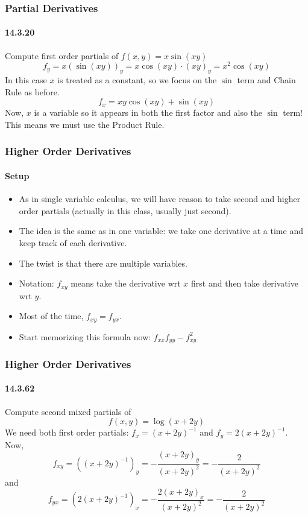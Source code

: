 \documentclass[xcolor=svgnames]{beamer}
\begin{document}
\begin{frame}
\frametitle{Partial Derivatives}
\framesubtitle{14.3.20}
Compute first order partials of $f(x,y) = x \sin (xy)$
\[
f_y = x (\sin (xy))_y = x \cos (xy) \cdot (xy)_y = x^2 \cos (xy) 
\]
In this case $x$ is treated as a constant, so we focus on the $\sin$ term and Chain Rule as before. 
\[
f_x = xy \cos (xy) + \sin (xy)
\]
Now, $x$ is a variable so it appears in both the first factor and also the $\sin$ term! This means we must use the Product Rule. 
\end{frame}
\begin{frame}
\frametitle{Higher Order Derivatives}
\framesubtitle{Setup}
\begin{itemize}
\item As in single variable calculus, we will have reason to take second and higher order partials (actually in this class, usually just second).
\item The idea is the same as in one variable: we take one derivative at a time and keep track of each derivative. 
\item The twist is that there are multiple variables.
\item Notation: $f_{xy}$ means take the derivative wrt $x$ first and then take derivative wrt $y$. 
\item Most of the time, $f_{xy} = f_{yx}$. 
\item Start memorizing this formula now: $f_{xx} f_{yy} - f_{xy}^2$
\end{itemize}
\end{frame}
\begin{frame}
\frametitle{Higher Order Derivatives}
\framesubtitle{14.3.62}
Compute second mixed partials of 
\[
	f(x,y) = \log (x + 2y)
\]
We need both first order partials: $f_x = (x+2y)^{-1}$ and $f_y = 2(x+2y)^{-1}$. Now,
\[
	f_{xy} = \left((x+2y)^{-1}\right)_y = -\frac{(x+2y)_y}{(x+2y)^2} = - \frac{2}{(x+2y)^2}
\]
and
\[
	f_{yx} =\left( 2(x+2y)^{-1} \right) _x =  -\frac{2(x+2y)_x}{(x+2y)^2} = - \frac{2}{(x+2y)^2}
\]
\end{frame}
\end{document}

